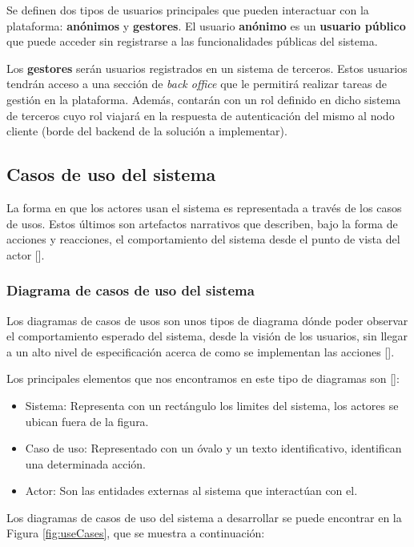 Se definen dos tipos de usuarios principales que pueden interactuar con la plataforma: \textbf{anónimos} y \textbf{gestores}. El usuario \textbf{anónimo} es un \textbf{usuario público} que puede acceder sin registrarse a las funcionalidades públicas del sistema.

Los \textbf{gestores} serán usuarios registrados en un sistema de terceros. Estos usuarios tendrán acceso a una sección de \textit{back office} que le permitirá realizar tareas de gestión en la plataforma. Además, contarán con un rol definido en dicho sistema de terceros cuyo rol viajará en la respuesta de autenticación del mismo al nodo cliente (borde del backend de la solución a implementar).

\subsection{Casos de uso del sistema}
La forma en que los actores usan el sistema es representada a través de los casos de usos. Estos últimos son artefactos narrativos que describen, bajo la forma de acciones y reacciones, el comportamiento del sistema desde el punto de vista del actor [\cite{91}]. 


\subsubsection{Diagrama de casos de uso del sistema}
Los diagramas de casos de usos son unos tipos de diagrama dónde poder observar el comportamiento esperado del sistema, desde la visión de los usuarios, sin llegar a un alto nivel de especificación acerca de como se implementan las acciones [\cite{91}]. 

Los principales elementos que nos encontramos en este tipo de diagramas son [\cite{91}]:
\begin{itemize}
\item Sistema: Representa con un rectángulo los limites del sistema, los actores se ubican fuera de la figura.
\item Caso de uso: Representado con un óvalo y un texto identificativo, identifican una determinada acción.
\item Actor: Son las entidades externas al sistema que interactúan con el.
\end{itemize}

Los diagramas de casos de uso del sistema a desarrollar se puede encontrar en la Figura \ref{fig:useCases}, que se muestra a continuación:


